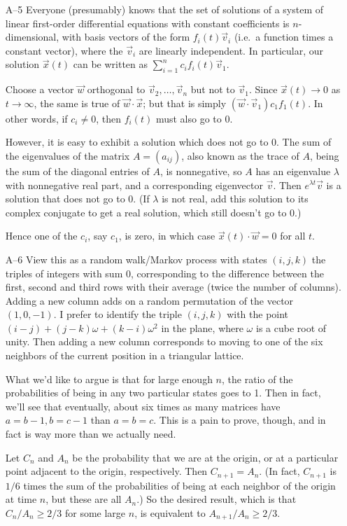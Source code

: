 \documentclass[amssymb,twocolumn,pra,10pt,aps]{revtex4-1}
\begin{document}
\begin{itemize}
\item[A--5]
Everyone (presumably) knows that the set of solutions of a system of
linear first-order differential equations with constant coefficients
is $n$-dimensional, with basis vectors of the form $f_{i}(t)
\vec{v}_{i}$ (i.e.\ a function times a constant vector), where the
$\vec{v}_{i}$ are linearly independent. In
particular, our solution $\vec{x}(t)$ can be written as $\sum_{i=1}^{n}
c_{i}f_{i}(t) \vec{v}_{1}$.

Choose a vector $\vec{w}$ orthogonal to $\vec{v}_{2}, \dots,
\vec{v}_{n}$ but not to $\vec{v}_1$. Since $\vec{x}(t) \to 0$ as $t
\to \infty$, the same is true of $\vec{w} \cdot \vec{x}$; but that is
simply $(\vec{w} \cdot \vec{v}_{1}) c_{1} f_{1}(t)$. In other words,
if $c_{i} \neq 0$, then $f_{i}(t)$ must also go to 0.

However, it is easy to exhibit a solution which does not go to 0. The
sum of the eigenvalues of the matrix $A = (a_{ij})$, also known as the
trace of $A$, being the sum of the diagonal entries of $A$, is
nonnegative, so $A$ has an eigenvalue $\lambda$ with nonnegative real
part, and a corresponding eigenvector $\vec{v}$. Then $e^{\lambda t}
\vec{v}$ is a solution that does not go to 0. (If $\lambda$ is not
real, add this solution to its complex conjugate to get a real
solution, which still doesn't go to 0.)

Hence one of the $c_{i}$, say $c_{1}$, is zero, in which case
$\vec{x}(t) \cdot \vec{w} = 0$ for all $t$.

\item[A--6]
View this as a random walk/Markov process with states $(i,j,k)$ the
triples of integers with sum 0, corresponding to the difference
between the first, second and third rows with their average (twice
the number of columns). Adding a new column adds on a random
permutation of the vector $(1,0,-1)$. I prefer to identify the
triple $(i,j,k)$ with the point $(i-j) + (j-k)\omega +
(k-i)\omega^{2}$ in the plane, where $\omega$ is a cube root of
unity. Then adding a new column corresponds to moving to one of the
six neighbors of the current position in a triangular lattice.

What we'd like to argue is that for large enough $n$, the ratio of
the probabilities of being in any two particular states goes to 1.
Then in fact, we'll see that eventually, about six times as many
matrices have $a=b-1,b=c-1$ than $a=b=c$. This is a pain to prove,
though, and in fact is way more than we actually need.

Let $C_{n}$ and $A_{n}$ be the probability that we are at the origin,
or at a particular point adjacent to the origin, respectively. Then
$C_{n+1} = A_{n}$. (In fact, $C_{n+1}$ is $1/6$ times the sum of the
probabilities of being at each neighbor of the origin at time $n$, but
these are all $A_{n}$.) So the desired result, which is that
$C_{n}/A_{n} \geq 2/3$ for some large $n$, is equivalent to
$A_{n+1}/A_{n} \geq 2/3$.


\end{itemize}
\end{document}
